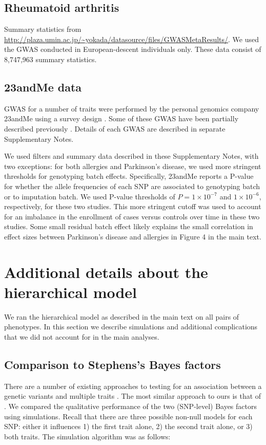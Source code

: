 \documentclass[11pt,titlepage]{article}
\begin{document}
\subsection{Rheumatoid arthritis}
Summary statistics from \url{http://plaza.umin.ac.jp/~yokada/datasource/files/GWASMetaResults/}. We used the GWAS conducted in European-descent individuals only. These data consist of 8,747,963 summary statistics.

\subsection{23andMe data} 
GWAS for a number of traits were performed by the personal genomics company 23andMe using a survey design \citep{Eriksson:2010aa}. Some of these GWAS have been partially described previously \citep{Eriksson:2012ab, Eriksson:2012aa, Eriksson:2010aa, Do:2011aa, Kiefer:2013aa}. Details of each GWAS are described in separate Supplementary Notes.

We used filters and summary data described in these Supplementary Notes, with two exceptions: for both allergies and Parkinson's disease, we used more stringent thresholds for genotyping batch effects. Specifically, 23andMe reports a P-value for whether the allele frequencies of each SNP are associated to genotyping batch or to imputation batch. We used P-value thresholds of $P = 1\times 10^{-7}$ and $1\times10^{-6}$, respectively, for these two studies. This more stringent cutoff was used to account for an imbalance in the enrollment of cases versus controls over time in these two studies. Some small residual batch effect likely explains the small correlation in effect sizes between Parkinson's disease and allergies in Figure 4 in the main text.
\section{Additional details about the hierarchical model}
We ran the hierarchical model as described in the main text on all pairs of phenotypes. In this section we describe simulations and additional complications that we did not account for in the main analyses.

\subsection{Comparison to Stephens's Bayes factors}

There are a number of existing approaches to testing for an association between a genetic variants and multiple traits \citep{Zhang:2014aa, Stephens:2013fk, OReilly:2012aa, Ferreira:2009aa, Zhou:2014aa, Korte:2012aa}. The most similar approach to ours is that of \citet{Stephens:2013fk}. We compared the qualitative performance of the two (SNP-level) Bayes factors using simulations. Recall that there are three possible non-null models for each SNP: either it influences 1) the first trait alone, 2) the second trait alone, or 3) both traits. The simulation algorithm was as follows:
\end{document}
